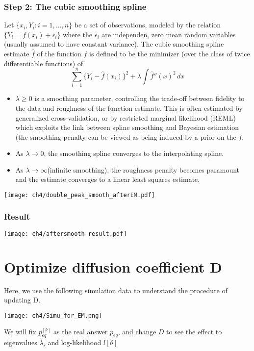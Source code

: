 \subsubsection{Step 2: The cubic smoothing spline}
\begin{definition}
    Let  $\{x_{i},Y_{i}:i=1,\dots ,n\}$ be a set of observations, modeled by the relation $\{Y_{i}=f(x_{i})+\epsilon _{i}\}$ where the $\epsilon _{i}$ are independen, zero mean random variables (usually assumed to have constant variance). The cubic smoothing spline estimate $\hat{f}$ of the function $f$ is defined to be the minimizer (over the class of twice differentiable functions) of
    \begin{equation}
         \sum _{i=1}^{n}\{Y_{i}-{\hat {f}}(x_{i})\}^{2}+\lambda \int {\hat {f}}''(x)^{2}\,dx
    \end{equation}
    \begin{itemize}
        \item $\lambda \geq 0$ is a smoothing parameter, controlling the trade-off between fidelity to the data and roughness of the function estimate. This is often estimated by generalized cross-validation, or by restricted marginal likelihood (REML) which exploits the link between spline smoothing and Bayesian estimation (the smoothing penalty can be viewed as being induced by a prior on the $f$.
        \item As $ \lambda \to 0$, the smoothing spline converges to the interpolating spline.
        \item As $\lambda \to \infty$(infinite smoothing), the roughness penalty becomes paramount and the estimate converges to a linear least squares estimate.
    \end{itemize}
\end{definition}
\begin{center}
    \texttt{[image: ch4/double\_peak\_smooth\_afterEM.pdf]}   
\end{center}

\subsubsection{Result}
\begin{center}
    \texttt{[image: ch4/aftersmooth\_result.pdf]}   
\end{center}

\section{Optimize diffusion coefficient D}
Here, we use the following simulation data to understand the procedure of updating D.
\begin{center}
    \texttt{[image: ch4/Simu\_for\_EM.png]}   
\end{center}
We will fix $p_{eq}^{[k]}$ as the real answer $p_{eq}$, and change $D$ to see the effect to eigenvalues $\lambda_i$ and log-likelihood $l[\theta]$

